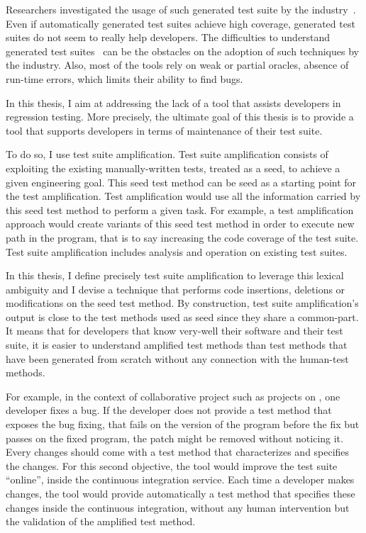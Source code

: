 Researchers investigated the usage of such generated test suite by the industry~\cite{TOSEM_userstudy}.
Even if automatically generated test suites achieve high coverage, generated test suites do not seem to really help developers.
The difficulties to understand generated test suites~\cite{TOSEM_userstudy} can be the obstacles on the adoption of such techniques by the industry.
Also, most of the tools rely on weak or partial oracles, \eg absence of run-time errors, which limits their ability to find bugs.

In this thesis, I aim at addressing the lack of a tool that assists developers in regression testing.
More precisely, the ultimate goal of this thesis is to provide a tool that supports developers in terms of maintenance of their test suite.

To do so, I use test suite amplification.
Test suite amplification consists of exploiting the existing manually-written tests, treated as a seed, to achieve a given engineering goal.
This seed test method can be seed as a starting point for the test amplification.
Test amplification would use all the information carried by this seed test method to perform a given task.
For example, a test amplification approach would create variants of this seed test method in order to execute new path in the program, that is to say increasing the code coverage of the test suite.
Test suite amplification includes analysis and operation on existing test suites.

In this thesis, I define precisely test suite amplification to leverage this lexical ambiguity and I devise a technique that performs code insertions, deletions or modifications on the seed test method.
By construction, test suite amplification's output is close to the test methods used as seed since they share a common-part.
It means that for developers that know very-well their software and their test suite, it is easier to understand amplified test methods than test methods that have been generated from scratch without any connection with the human-test methods.

For example, in the context of collaborative project such as projects on \gh, one developer fixes a bug.
If the developer does not provide a test method that exposes the bug fixing, \ie that fails on the version of the program before the fix but passes on the fixed program, the patch might be removed without noticing it.
Every changes should come with a test method that characterizes and specifies the changes.
For this second objective, the tool would improve the test suite ``online'', \ie inside the continuous integration service.
Each time a developer makes changes, the tool would provide automatically a test method that specifies these changes inside the continuous integration, without any human intervention but the validation of the amplified test method.


